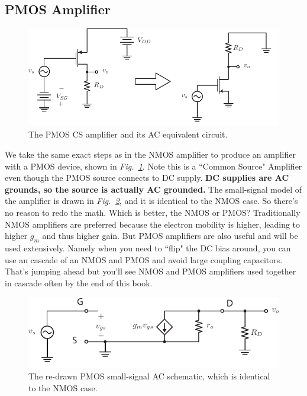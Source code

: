 \subsection{PMOS Amplifier}
\begin{figure}[tb]
\begin{center}
\includegraphics[scale=1]{cs_amp_pmos_ss1}
\end{center}
\caption{The PMOS CS amplifier and its AC equivalent circuit.}
\label{fig:cs_amp_pmos_ss1}
\end{figure}
We take the same exact steps as in the NMOS amplifier to produce an amplifier with a PMOS device, shown in \emph{Fig.~\ref{fig:cs_amp_pmos_ss1}}.  Note this is a ``Common Source" Amplifier even though the PMOS source connects to DC supply.  \textbf{DC supplies are AC grounds, so the source is actually AC grounded.}   The small-signal model of the amplifier is drawn in \emph{Fig.~\ref{fig:csamp_pmos_ss}}, and it is identical to the NMOS case.  So there's no reason to redo the math.
Which is better, the NMOS or PMOS?  Traditionally NMOS amplifiers are preferred because the electron mobility is higher, leading to higher $g_m$ and thus higher gain.  But PMOS amplifiers are also useful and will be used extensively.  Namely when you need to ``flip" the DC bias around, you can use an cascade of an NMOS and PMOS and avoid large coupling capacitors.  That's jumping ahead but you'll see NMOS and PMOS amplifiers used together in cascade often by the end of this book.  
\begin{figure}[tb]
\centering
\includegraphics[scale=1]{csamp_pmos_ss}
\caption{The re-drawn PMOS small-signal AC schematic, which is identical to the NMOS case.} \label{fig:csamp_pmos_ss}
\end{figure}
